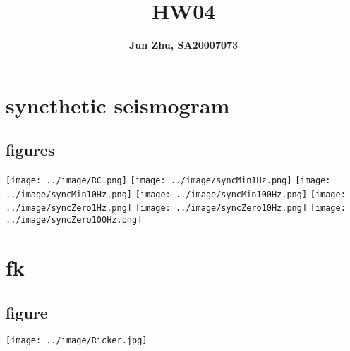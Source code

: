 \documentclass{article}
\title{\textbf{HW04}}
\author{\textbf{Jun Zhu, SA20007073}}
\begin{document}
\maketitle
\newpage{}

\section{syncthetic seismogram}
\subsection{figures}
\texttt{[image: ../image/RC.png]}
\texttt{[image: ../image/syncMin1Hz.png]}
\texttt{[image: ../image/syncMin10Hz.png]}
\texttt{[image: ../image/syncMin100Hz.png]}
\texttt{[image: ../image/syncZero1Hz.png]}
\texttt{[image: ../image/syncZero10Hz.png]}
\texttt{[image: ../image/syncZero100Hz.png]}
\section{fk}
\subsection{figure}
\texttt{[image: ../image/Ricker.jpg]}
\end{document}
